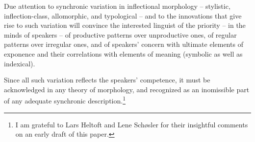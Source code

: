 \documentclass[output=paper, colorlinks,citecolor=brown]{langsci/langscibook}
\begin{document}
Due attention to synchronic variation in inflectional morphology – stylistic, inflection-class, allomorphic, and typological – and to the innovations that give rise to such variation will convince the interested linguist of the priority – in the minds of speakers – of productive patterns over unproductive ones, of regular patterns over irregular ones, and of speakers' concern with ultimate elements of exponence and their correlations with elements of meaning (symbolic as well as indexical). 

Since all such variation reflects the speakers' competence, it must be acknowledged in any theory of morphology, and recognized as an inomissible part of any adequate synchronic description.\footnote{I am grateful to Lars Heltoft and Lene Schøsler for their insightful comments on an early draft of this paper.}
\end{document}
